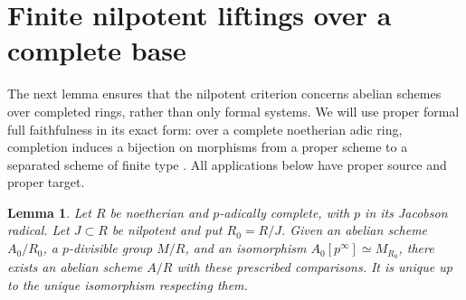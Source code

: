 \documentclass[11pt]{article}
\newtheorem{lemma}[theorem]{Lemma}
\theoremstyle{definition}\newtheorem{definition}[theorem]{Definition}
\theoremstyle{remark}\newtheorem{remark}[theorem]{Remark}
\begin{document}
\section{Finite nilpotent liftings over a complete base}

The next lemma ensures that the nilpotent criterion concerns abelian schemes over completed rings, rather than only formal systems. We will use proper formal full faithfulness in its exact form: over a complete noetherian adic ring, completion induces a bijection on morphisms from a proper scheme to a separated scheme of finite type \citep[Theorem~5.4.1, pp.~156--157]{EGAIII}. All applications below have proper source and proper target.

\begin{lemma}\label{lem:complete}
Let $R$ be noetherian and $p$-adically complete, with $p$ in its Jacobson radical. Let $J\subset R$ be nilpotent and put $R_0=R/J$. Given an abelian scheme $A_0/R_0$, a $p$-divisible group $M/R$, and an isomorphism $A_0[p^\infty]\simeq M_{R_0}$, there exists an abelian scheme $A/R$ with these prescribed comparisons. It is unique up to the unique isomorphism respecting them.
\end{lemma}
\end{document}
